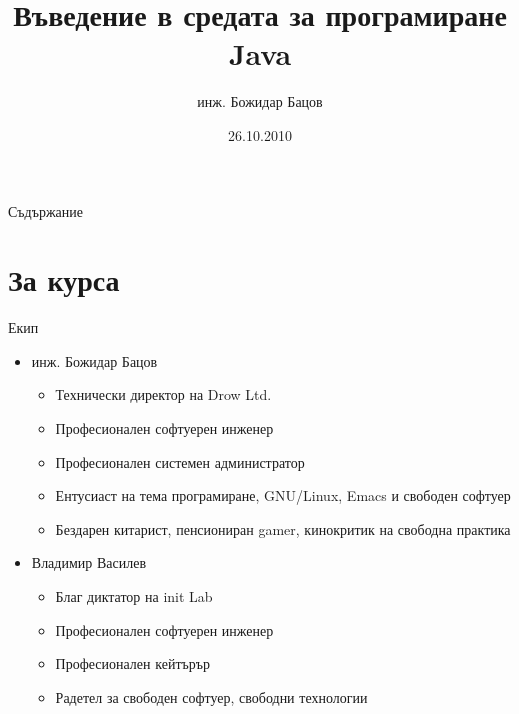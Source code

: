 \documentclass{beamer}
\title{Въведение в средата за програмиране Java}
\author{инж. Божидар Бацов}
\institute{Drow Ltd.}
\date{26.10.2010}
\begin{document}
\begin{frame}
  \titlepage
\end{frame}

\begin{frame}{Съдържание}
  \tableofcontents[pausesections]
\end{frame}

\section{За курса}

\begin{frame}{Екип}
  \transdissolve
  \begin{itemize}
  \item инж. Божидар Бацов
    \begin{itemize}
    \item Технически директор на Drow Ltd.
    \item Професионален софтуерен инженер
    \item Професионален системен администратор
    \item Ентусиаст на тема програмиране, GNU/Linux, Emacs и свободен
      софтуер
    \item Бездарен китарист, пенсиониран gamer, кинокритик на свободна
      практика
    \end{itemize}
  \item Владимир Василев
    \begin{itemize}
      \item Благ диктатор на init Lab
      \item Професионален софтуерен инженер
      \item Професионален кейтърър
      \item Радетел за свободен софтуер, свободни технологии
    \end{itemize}
  \end{itemize}
\end{frame}
\end{document}
